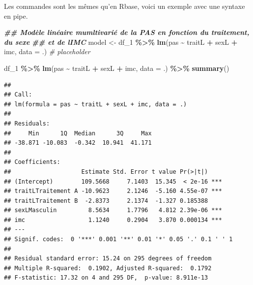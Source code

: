 \documentclass[
]{book}
\newenvironment{Shaded}{\begin{snugshade}}{\end{snugshade}}
\newcommand{\AttributeTok}[1]{\textcolor[rgb]{0.13,0.29,0.53}{#1}}
\newcommand{\CommentTok}[1]{\textcolor[rgb]{0.56,0.35,0.01}{\textit{#1}}}
\newcommand{\DocumentationTok}[1]{\textcolor[rgb]{0.56,0.35,0.01}{\textbf{\textit{#1}}}}
\newcommand{\FunctionTok}[1]{\textcolor[rgb]{0.13,0.29,0.53}{\textbf{#1}}}
\newcommand{\NormalTok}[1]{#1}
\newcommand{\OtherTok}[1]{\textcolor[rgb]{0.56,0.35,0.01}{#1}}
\newcommand{\SpecialCharTok}[1]{\textcolor[rgb]{0.81,0.36,0.00}{\textbf{#1}}}
\begin{document}
Les commandes sont les mêmes qu'en Rbase, voici un exemple avec une syntaxe en pipe.

\begin{Shaded}
\begin{Highlighting}[]
\DocumentationTok{\#\# Modèle linéaire mumltivarié de la PAS en fonction du traitement, du sexe }
\DocumentationTok{\#\# et de l\textquotesingle{}IMC}
\NormalTok{model }\OtherTok{\textless{}{-}}\NormalTok{ df\_1 }\SpecialCharTok{\%\textgreater{}\%} \FunctionTok{lm}\NormalTok{(pas }\SpecialCharTok{\textasciitilde{}}\NormalTok{ traitL }\SpecialCharTok{+}\NormalTok{ sexL }\SpecialCharTok{+}\NormalTok{ imc, }
                     \AttributeTok{data =}\NormalTok{ .) }\CommentTok{\# placeholder}

\NormalTok{df\_1 }\SpecialCharTok{\%\textgreater{}\%} 
  \FunctionTok{lm}\NormalTok{(pas }\SpecialCharTok{\textasciitilde{}}\NormalTok{ traitL }\SpecialCharTok{+}\NormalTok{ sexL }\SpecialCharTok{+}\NormalTok{ imc, }
     \AttributeTok{data =}\NormalTok{ .) }\SpecialCharTok{\%\textgreater{}\%}
  \FunctionTok{summary}\NormalTok{()}
\end{Highlighting}
\end{Shaded}

\begin{verbatim}
## 
## Call:
## lm(formula = pas ~ traitL + sexL + imc, data = .)
## 
## Residuals:
##     Min      1Q  Median      3Q     Max 
## -38.871 -10.083  -0.342  10.941  41.171 
## 
## Coefficients:
##                    Estimate Std. Error t value Pr(>|t|)    
## (Intercept)        109.5668     7.1403  15.345  < 2e-16 ***
## traitLTraitement A -10.9623     2.1246  -5.160 4.55e-07 ***
## traitLTraitement B  -2.8373     2.1374  -1.327 0.185388    
## sexLMasculin         8.5634     1.7796   4.812 2.39e-06 ***
## imc                  1.1240     0.2904   3.870 0.000134 ***
## ---
## Signif. codes:  0 '***' 0.001 '**' 0.01 '*' 0.05 '.' 0.1 ' ' 1
## 
## Residual standard error: 15.24 on 295 degrees of freedom
## Multiple R-squared:  0.1902, Adjusted R-squared:  0.1792 
## F-statistic: 17.32 on 4 and 295 DF,  p-value: 8.911e-13
\end{verbatim}
\end{document}
